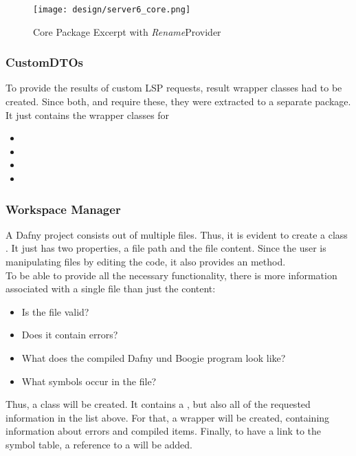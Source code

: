 \begin{figure}[H]
    \centering
    \texttt{[image: design/server6\_core.png]}
    \caption{Core Package Excerpt with \textit{Rename}Provider}
    \label{fig:server_core}
\end{figure}

\subsubsection{CustomDTOs}
To provide the results of custom LSP requests, result wrapper classes had to be created.
Since both,  and  require these, they were extracted to a separate package.
It just contains the wrapper classes for
\begin{itemize}
    \item {}
    \item {}
    \item {}
    \item {}
\end{itemize}

\subsubsection{Workspace Manager}
A Dafny project consists out of multiple  files.
Thus, it is evident to create a class .
It just has two properties, a file path and the file content.
Since the user is manipulating files by editing the code, it also provides an  method.\\

To be able to provide all the necessary functionality, there is more information associated with a single file than just the content:
\begin{itemize}
    \item Is the file valid?
    \item Does it contain errors?
    \item What does the compiled Dafny und Boogie program look like?
    \item What symbols occur in the file?
\end{itemize}

Thus, a class  will be created.
It contains a , but also all of the requested information in the list above.
For that, a wrapper  will be created, containing information about errors and compiled items.
Finally, to have a link to the symbol table, a reference to a  will be added.\\

